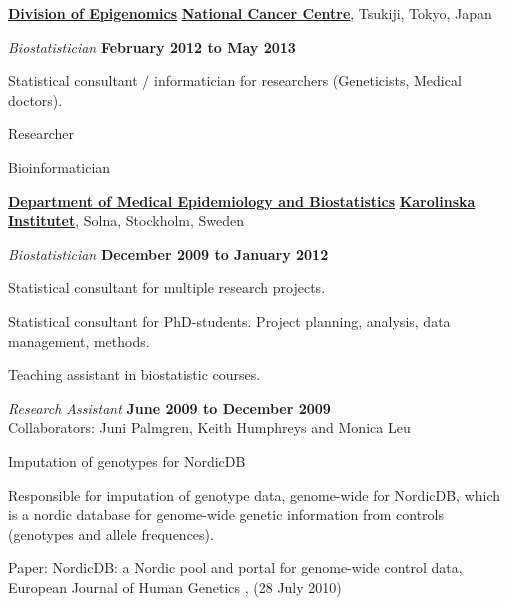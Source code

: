 \halfblankline

\href{http://www.ncc.go.jp/en/nccri/divisions/14carc/14carc.html}{\textbf{Division of Epigenomics}}
\href{http://www.ncc.go.jp/}{\textbf{National Cancer Centre}}, Tsukiji, Tokyo, Japan
\begin{outerlist}
\item[] \textit{Biostatistician}%
	\hfill \textbf{February 2012 to May 2013}
\begin{innerlist}
\item Statistical consultant / informatician for researchers (Geneticists, Medical doctors).
\item Researcher
\item Bioinformatician
\end{innerlist}
\end{outerlist}

\halfblankline

\href{http://ki.se/ki/jsp/polopoly.jsp?d=9600}{\textbf{Department of Medical Epidemiology and Biostatistics}}
\href{http://www.ki.se/}{\textbf{Karolinska Institutet}}, Solna, Stockholm, Sweden
\begin{outerlist}
\item[] \textit{Biostatistician}%
        \hfill \textbf{December 2009 to January 2012}
\begin{innerlist}
\item Statistical consultant for multiple research projects.
\item Statistical consultant for PhD-students. Project planning, analysis, data management, methods.
\item Teaching assistant in biostatistic courses.
\end{innerlist}

\item[] \textit{Research Assistant}%
        \hfill \textbf{June 2009 to December 2009}
\\ Collaborators: Juni Palmgren, Keith Humphreys and Monica Leu
\begin{innerlist}
  \item Imputation of genotypes for NordicDB
  \begin{innerlist}
    \item Responsible for imputation of genotype data, genome-wide for NordicDB, which is a nordic database for genome-wide genetic information from controls (genotypes and allele frequences).
    \item Paper: NordicDB: a Nordic pool and portal for genome-wide control data, European Journal of Human Genetics , (28 July 2010)
  \end{innerlist}
\end{innerlist}

\end{outerlist}

